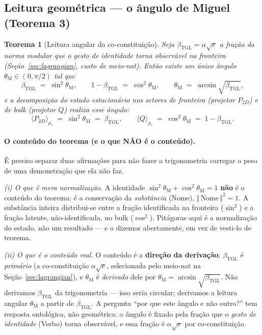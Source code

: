 \documentclass[12pt,a4paper]{article}
\newtheorem{theorem}{Teorema}
\newcommand{\betatgl}{\beta_{\text{TGL}}}
\newcommand{\thetaM}{\theta_{\text{M}}}
\begin{document}
\subsection{Leitura geométrica --- o ângulo de Miguel (Teorema 3)}
\label{sec:radical-geometric}

\begin{theorem}[Leitura angular da co-constituição]
\label{th:trig-id}
Seja $\betatgl = \alpha\sqrt{e}$ a fração da norma modular que o gesto de
identidade torna observável na fronteira (Seção~\ref{sec:lagrangian}, custo de
meio-nat).  Então existe um único ângulo $\thetaM \in (0, \pi/2)$ tal que
\begin{equation}
\betatgl \;=\; \sin^{2}\thetaM,
\qquad
1 - \betatgl \;=\; \cos^{2}\thetaM,
\qquad
\thetaM \;=\; \arcsin\sqrt{\betatgl},
\label{eq:trig-id}
\end{equation}
e a decomposição do estado estacionário nos setores de fronteira (projetor
$P_{2D}$) e de bulk (projetor $Q$) realiza esse ângulo:
\begin{equation}
\langle P_{2D} \rangle_{\rho_{*}} \;=\; \sin^{2}\thetaM \;=\; \betatgl,
\qquad
\langle Q \rangle_{\rho_{*}} \;=\; \cos^{2}\thetaM \;=\; 1 - \betatgl.
\end{equation}
\end{theorem}

\paragraph{O conteúdo do teorema (e o que NÃO é o conteúdo).}
É preciso separar duas afirmações para não fazer a trigonometria carregar o
peso de uma demonstração que ela não faz.

\emph{(i) O que é mera normalização.}  A identidade
$\sin^{2}\thetaM + \cos^{2}\thetaM = 1$ \textbf{não} é o conteúdo do teorema:
é a conservação da \emph{substância} (Nome), $\Vert\,\text{Nome}\,\Vert^{2}=1$.
A substância inteira distribui-se entre a fração identificada na fronteira
($\sin^{2}$) e a fração latente, não-identificada, no bulk ($\cos^{2}$).
Pitágoras aqui é a normalização do estado, não um resultado --- e o dizemos
abertamente, em vez de vesti-lo de teorema.

\emph{(ii) O que é o conteúdo real.}  O conteúdo é a \textbf{direção da
derivação}: $\betatgl$ é \emph{primário} (a co-constituição $\alpha\sqrt{e}$,
selecionada pelo meio-nat na Seção~\ref{sec:lagrangian}), e $\thetaM$ é
\emph{derivado} dele por $\thetaM = \arcsin\sqrt{\betatgl}$.  Não derivamos
$\betatgl$ da trigonometria --- isso seria circular; derivamos a leitura
angular $\thetaM$ a partir de $\betatgl$.  A pergunta ``por que este ângulo e
não outro?'' tem resposta ontológica, não geométrica: o ângulo é fixado pela
fração que o \emph{gesto de identidade} (Verbo) torna observável, e essa
fração é $\alpha\sqrt{e}$ por co-constituição.
\end{document}
